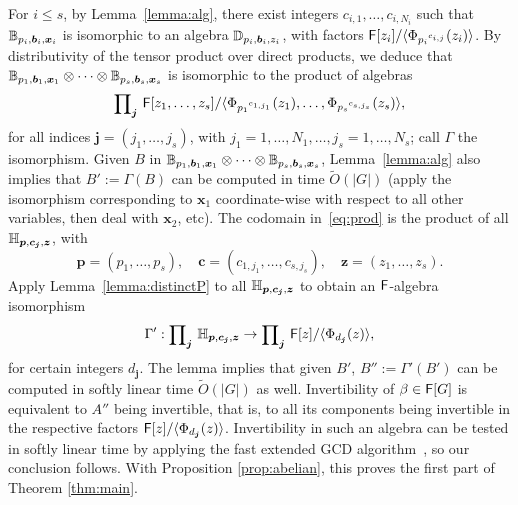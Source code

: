 For $i \le s$, by Lemma~\ref{lemma:alg}, there exist integers
$c_{i,1},\dots,c_{i,N_i}$ such that
$\mathbb{B}_{p_i,\boldsymbol{b}_i,\boldsymbol{x}_i}$ is isomorphic to an
algebra $\mathbb{D}_{p_i, \boldsymbol{b}_i, z_i}$, with factors 
${\mathsf{F}}[z_i]/\langle \Phi_{{p_i}^{c_{i,j}}}(z_i) \rangle$.
By distributivity of the tensor product over direct products, we
deduce that $\mathbb{B}_{p_1,\boldsymbol{b}_1,\boldsymbol{x}_1} \otimes \cdots
\otimes \mathbb{B}_{p_s,\boldsymbol{b}_s,\boldsymbol{x}_s}$ is isomorphic to
the product of algebras
 \begin{equation}\label{eq:prod}
\text{\small $\prod$}_{\boldsymbol{j}}~ {\mathsf{F}}[z_1,\dots,z_s]/
\langle \Phi_{{p_1}^{c_{1,j_1}}}(z_1),\dots, \Phi_{{p_s}^{c_{s,j_s}}}(z_s) \rangle,   
 \end{equation}
for all indices $\boldsymbol{j}=(j_1,\dots,j_s)$, with
$j_1 =1,\dots,N_1,\dots,j_s=1,\dots,N_s$;
call $\Gamma$ the isomorphism. Given $B$ in $\mathbb{B}_{p_1,\boldsymbol{b}_1,\boldsymbol{x}_1} \otimes
\cdots \otimes \mathbb{B}_{p_s,\boldsymbol{b}_s,\boldsymbol{x}_s}$,
Lemma~\ref{lemma:alg} also implies that $B':=\Gamma(B)$ can be
computed in time $\tilde{O}(|G|)$ (apply the isomorphism
corresponding to $\boldsymbol{x}_1$ coordinate-wise with respect to
all other variables, then deal with $\boldsymbol{x}_2$, etc).
The codomain in~\eqref{eq:prod} is the product of all $\mathbb{H}_{\boldsymbol{p},\boldsymbol{c}_{\boldsymbol{j}},\boldsymbol{z}}$,
with 
$$\boldsymbol{p}=(p_1,\dots,p_s),\quad \boldsymbol{c}=(c_{1,j_1},\dots,c_{s,j_s}),\quad \boldsymbol{z}=(z_1,\dots,z_s).$$
Apply Lemma~\ref{lemma:distinctP} to all 
$\mathbb{H}_{\boldsymbol{p},\boldsymbol{c}_{\boldsymbol{j}},\boldsymbol{z}}$ to obtain
an ${\mathsf{F}}$-algebra isomorphism
$$\Gamma': \text{\small $\prod$}_{\boldsymbol{j}}~
\mathbb{H}_{\boldsymbol{p},\boldsymbol{c}_{\boldsymbol{j}},\boldsymbol{z}} \to
\text{\small $\prod$}_{\boldsymbol{j}} ~{\mathsf{F}}[z]/\langle
\Phi_{d_{\boldsymbol{j}}}(z) \rangle,$$ for certain integers
$d_{\boldsymbol{j}}$. The lemma implies that given $B'$,
$B'':=\Gamma'(B')$ can be computed in softly linear time
$\tilde{O}(|G|)$ as well. Invertibility of $\beta \in {\mathsf{F}}[G]$ is
equivalent to $A''$ being invertible, that is, to all its components
being invertible in the respective factors ${\mathsf{F}}[z]/\langle
\Phi_{d_{\boldsymbol{j}}}(z) \rangle$. Invertibility in such an
algebra can be tested in softly linear time by applying the fast
extended GCD algorithm~\cite[Chapter~11]{vzGathen13}, so our conclusion follows. 
With Proposition \ref{prop:abelian}, this proves
the first part of Theorem \ref{thm:main}.



